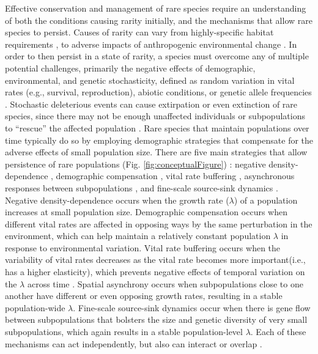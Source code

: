 \documentclass[12pt, letterpaper]{article}
\begin{document}
Effective conservation and management of rare species require an understanding of both the conditions causing rarity initially, and the mechanisms that allow rare species to persist. Causes of rarity can vary from highly-specific habitat requirements \cite{Sgarbi2018YouTime}, to adverse impacts of anthropogenic environmental change \cite{Vincent2020-tz}. In order to then persist in a state of rarity, a species must overcome any of multiple potential challenges, primarily the negative effects of demographic, environmental, and genetic stochasticity, defined as random variation in vital rates (e.g., survival, reproduction), abiotic conditions, or genetic allele frequencies \cite{May1973StabilityEnvironments}. Stochastic deleterious events can cause extirpation or even extinction of rare species, since there may not be enough unaffected individuals or subpopulations to “rescue” the affected population \cite{Nei1975ThePopulations}. Rare species that maintain populations over time typically do so by employing demographic strategies that compensate for the adverse effects of small population size. There are five main strategies that allow persistence of rare populations (Fig. \ref{fig:conceptualFigure}) \cite{Dibner2019}: negative density-dependence \cite{Rovere2019PersistentlyAvoid}, demographic compensation \cite{Villellas2015DemographicImplications}, vital rate buffering \cite{Pfister1998PatternsImplications, Hilde2020TheChallenges}, asynchronous responses between subpopulations \cite{Abbott2017PortfolioWeberi}, and fine-scale source-sink dynamics \cite{Kauffman2004SpatialPopulation, Pulliam2016SourcesUse}. Negative density-dependence occurs when the growth rate ($\lambda$)  of a population increases at small population size. Demographic compensation occurs when different vital rates are affected in opposing ways by the same perturbation in the environment, which can help maintain a relatively constant population $\lambda$ in response to environmental variation. Vital rate buffering occurs when the variability of vital rates decreases as the vital rate becomes more important(i.e., has a higher elasticity), which prevents negative effects of temporal variation on the $\lambda$ across time \cite{Tuljapurkar1989An.}. Spatial asynchrony occurs when subpopulations close to one another have different or even opposing growth rates, resulting in a stable population-wide $\lambda$. Fine-scale source-sink dynamics occur when there is gene flow between subpopulations that bolsters the size and genetic diversity of very small subpopulations, which again results in a stable population-level $\lambda$. Each of these mechanisms can act independently, but also can interact or overlap \cite{Dibner2019}.  
\end{document}

